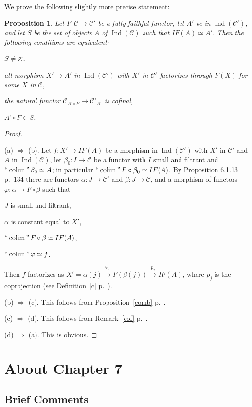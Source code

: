 \documentclass[12pt]{article}%
\newtheorem{prop}[thm]{Proposition}
\theoremstyle{remark}
\theoremstyle{definition}
\newcommand{\cc}{\mathcal}
\newcommand{\then}{\Rightarrow}
\newcommand{\xr}{\xrightarrow}
\DeclareMathOperator*{\colim}{colim}
\DeclareMathOperator*{\ic}{``\colim"}
\DeclareMathOperator{\Ind}{Ind}
\begin{document}
We prove the following slightly more precise statement:
%
\begin{prop}\label{myprop1}
%
Let $F:\cc C\to\cc C'$ be a fully faithful functor, let $A'$ be in $\Ind(\cc C')$, and let $S$ be the set of objects $A$ of $\Ind(\cc C)$ such that $IF(A)\simeq A'$. Then the following conditions are equivalent: 

 $S\neq\varnothing$, 

 all morphism $X'\to A'$ in $\Ind(\cc C')$ with $X'$ in $\cc C'$ factorizes through $F(X)$ for some $X$ in $\cc C$, 

 the natural functor $\cc C_{A'\circ F}\to\cc C'_{A'}$ is cofinal, 

 $A'\circ F\in S$.
%
\end{prop}
%
\begin{proof}\ 

\noindent(a) $\then$ (b). Let $f:X'\to IF(A)$ be a morphism in $\Ind(\cc C')$ with $X'$ in $\cc C'$ and $A$ in $\Ind(\cc C)$, let $\beta_0:I\to\cc C$ be a functor with $I$ small and filtrant and $\ic\beta_0\simeq A$; in particular $\ic F\circ\beta_0\simeq IF(A)$. By Proposition 6.1.13 p.~134 there are functors $\alpha:J\to\cc C'$ and $\beta:J\to\cc C$, and a morphism of functors $\varphi:\alpha\to F\circ\beta$ such that 

$J$ is small and filtrant, 

$\alpha$ is constant equal to $X'$, 

$\ic F\circ\beta\simeq IF(A)$, 

$\ic\varphi\simeq f$. 

\noindent Then $f$ factorizes as $X'=\alpha(j)\xr{\varphi_j}F(\beta(j))\xr{p_j}IF(A)$, where $p_j$ is the coprojection (see Definition~\ref{c} p.~\pageref{c}).

\noindent(b) $\then$ (c). This follows from Proposition~\ref{comb} p.~\pageref{comb}. 

\noindent(c) $\then$ (d). This follows from Remark~\ref{cof} p.~\pageref{cof}. 

\noindent(d) $\then$ (a). This is obvious.
\end{proof}


\section{About Chapter 7}

\subsection{Brief Comments}
\end{document}
